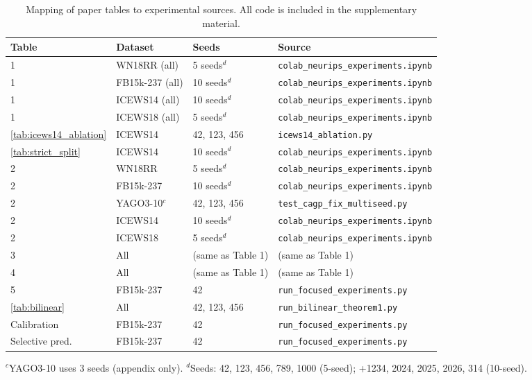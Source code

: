 \documentclass{article}
\begin{document}
\begin{table}[ht]
\centering
\caption{Mapping of paper tables to experimental sources. All code is included in the supplementary material.}
\small
\begin{tabular}{llll}
\toprule
Table & Dataset & Seeds & Source \\
\midrule
1 & WN18RR (all) & 5 seeds$^d$ & \texttt{colab\_neurips\_experiments.ipynb} \\
1 & FB15k-237 (all) & 10 seeds$^d$ & \texttt{colab\_neurips\_experiments.ipynb} \\
1 & ICEWS14 (all) & 10 seeds$^d$ & \texttt{colab\_neurips\_experiments.ipynb} \\
1 & ICEWS18 (all) & 5 seeds$^d$ & \texttt{colab\_neurips\_experiments.ipynb} \\
\ref{tab:icews14_ablation} & ICEWS14 & 42, 123, 456 & \texttt{icews14\_ablation.py} \\
\ref{tab:strict_split} & ICEWS14 & 10 seeds$^d$ & \texttt{colab\_neurips\_experiments.ipynb} \\
\midrule
2 & WN18RR & 5 seeds$^d$ & \texttt{colab\_neurips\_experiments.ipynb} \\
2 & FB15k-237 & 10 seeds$^d$ & \texttt{colab\_neurips\_experiments.ipynb} \\
2 & YAGO3-10$^c$ & 42, 123, 456 & \texttt{test\_cagp\_fix\_multiseed.py} \\
2 & ICEWS14 & 10 seeds$^d$ & \texttt{colab\_neurips\_experiments.ipynb} \\
2 & ICEWS18 & 5 seeds$^d$ & \texttt{colab\_neurips\_experiments.ipynb} \\
\midrule
3 & All & (same as Table 1) & (same as Table 1) \\
4 & All & (same as Table 1) & (same as Table 1) \\
5 & FB15k-237 & 42 & \texttt{run\_focused\_experiments.py} \\
\ref{tab:bilinear} & All & 42, 123, 456 & \texttt{run\_bilinear\_theorem1.py} \\
Calibration & FB15k-237 & 42 & \texttt{run\_focused\_experiments.py} \\
Selective pred. & FB15k-237 & 42 & \texttt{run\_focused\_experiments.py} \\
\bottomrule
\end{tabular}

\scriptsize
$^c$YAGO3-10 uses 3 seeds (appendix only). \quad
$^d$Seeds: 42, 123, 456, 789, 1000 (5-seed); +1234, 2024, 2025, 2026, 314 (10-seed).
\end{table}
\end{document}
